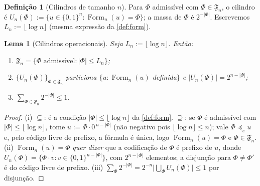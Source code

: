 \documentclass[11pt,a4paper]{article}
\newtheorem{lemma}[theorem]{Lema}
\theoremstyle{definition}
\newtheorem{definition}[theorem]{Definição}
\theoremstyle{remark}
\newcommand{\Fm}{\operatorname{Form}}
\begin{document}
\begin{definition}[Cilindros de tamanho $n$]\label{def:cilindros}
Para $\Phi$ admissível com $\Phi \in \mathfrak{F}_n$, o cilindro é
$U_n(\Phi) := \{u \in \{0,1\}^n : \Fm_n(u) = \Phi\}$; a massa de
$\Phi$ é $2^{-|\Phi|}$. Escrevemos $L_n := \lfloor \log n \rfloor$
(mesma expressão da \cref{def:form}).
\end{definition}

\begin{lemma}[Cilindros operacionais]\label{lem:cilindros-n}
Seja $L_n := \lfloor \log n \rfloor$. Então:
\begin{enumerate}
\item[(i)] $\mathfrak{F}_n = \{\Phi \text{ admissível} : |\Phi| \leq L_n\}$;
\item[(ii)] $\{U_n(\Phi)\}_{\Phi \in \mathfrak{F}_n}$ particiona
  $\{u : \Fm_n(u)$ definida$\}$ e $|U_n(\Phi)| = 2^{n - |\Phi|}$;
\item[(iii)] $\sum_{\Phi \in \mathfrak{F}_n} 2^{-|\Phi|} \leq 1$.
\end{enumerate}
\end{lemma}

\begin{proof}
(i) $\subseteq$: é a condição $|\Phi| \leq \lfloor \log n \rfloor$ da
\cref{def:form}. $\supseteq$: se $\Phi$ é admissível com
$|\Phi| \leq \lfloor \log n \rfloor$, tome $u := \Phi \cdot
0^{\,n - |\Phi|}$ (não negativo pois $\lfloor \log n \rfloor \leq n$);
vale $\Phi \preceq_e u$ e, pelo código livre de prefixo, a fórmula é
única, logo $\Fm_n(u) = \Phi$ e $\Phi \in \mathfrak{F}_n$.
(ii) $\Fm_n(u) = \Phi$ \emph{quer dizer} que a codificação de $\Phi$ é
prefixo de $u$, donde $U_n(\Phi) = \{\Phi \cdot v : v \in
\{0,1\}^{n - |\Phi|}\}$, com $2^{n - |\Phi|}$ elementos; a
disjunção para $\Phi \neq \Phi'$ é do código livre de prefixo.
(iii) $\sum_{\Phi} 2^{-|\Phi|} = 2^{-n} \bigl|\bigcup_\Phi
U_n(\Phi)\bigr| \leq 1$ por disjunção.
\end{proof}
\end{document}
